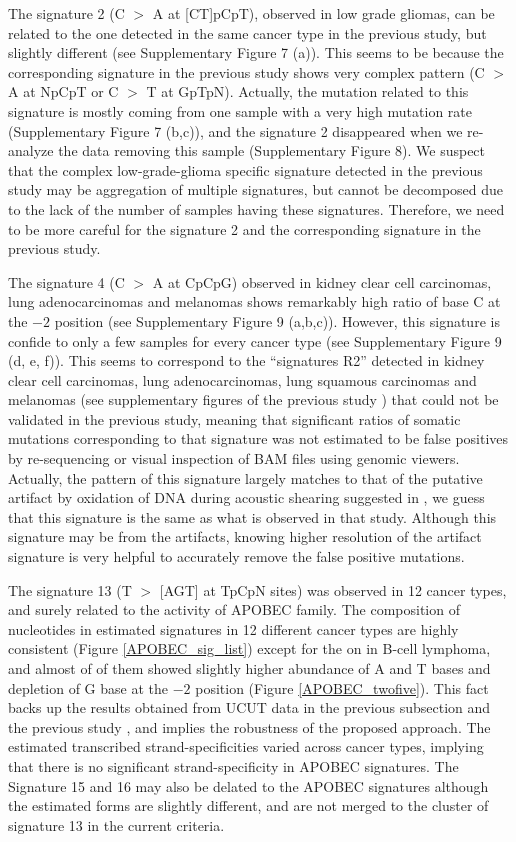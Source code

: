 The signature 2 (C $>$ A at [CT]pCpT), observed in low grade gliomas, 
can be related to the one detected in the same cancer type in the previous study, but slightly different (see Supplementary Figure 7 (a)). 
This seems to be because the corresponding signature in the previous study shows very complex pattern (C $>$ A at NpCpT or C $>$ T at GpTpN).
Actually, the mutation related to this signature is mostly coming from one sample with a very high mutation rate (Supplementary Figure 7 (b,c)), 
and the signature 2 disappeared when we re-analyze the data removing this sample (Supplementary Figure 8).
We suspect that the complex low-grade-glioma specific signature detected in the previous study may be aggregation of multiple signatures,
but cannot be decomposed due to the lack of the number of samples having these signatures.
Therefore, we need to be more careful for the signature 2 and the corresponding signature in the previous study.


The signature 4 (C $>$ A at CpCpG) observed in kidney clear cell carcinomas, lung adenocarcinomas and melanomas 
shows remarkably high ratio of base C at the $-2$ position (see Supplementary Figure 9 (a,b,c)).
However, this signature is confide to only a few samples for every cancer type (see Supplementary Figure 9 (d, e, f)).
This seems to correspond to the ``signatures R2''  detected in kidney clear cell carcinomas, lung adenocarcinomas, lung squamous carcinomas and melanomas
(see supplementary figures of the previous study \cite{pmid23318258})
that could not be validated in the previous study,
meaning that significant ratios of somatic mutations corresponding to that signature was not estimated to be false positives by re-sequencing or visual inspection of BAM files using genomic viewers.
Actually, the pattern of this signature largely matches to that of the putative artifact by oxidation of DNA during acoustic shearing suggested in \cite{pmid23303777},
we guess that this signature is the same as what is observed in that study.
Although this signature may be from the artifacts, knowing higher resolution of the artifact signature is very helpful to accurately remove the false positive mutations.


The signature 13 (T $>$ [AGT] at TpCpN sites) was observed in 12 cancer types, and surely related to the activity of APOBEC family.
The composition of nucleotides in estimated signatures in 12 different cancer types are highly consistent (Figure \ref{APOBEC_sig_list}) except for the on in B-cell lymphoma,
and almost of of them showed slightly higher abundance of A and T bases and depletion of G base at the $-2$ position (Figure \ref{APOBEC_twofive}).
This fact backs up the results obtained from UCUT data in the previous subsection and the previous study \cite{pmid23318258},
and implies the robustness of the proposed approach.
The estimated transcribed strand-specificities varied across cancer types, implying that there is no significant strand-specificity in APOBEC signatures.
The Signature 15 and 16 may also be delated to the APOBEC signatures although the estimated forms are slightly different,
and are not merged to the cluster of signature 13 in the current criteria.


